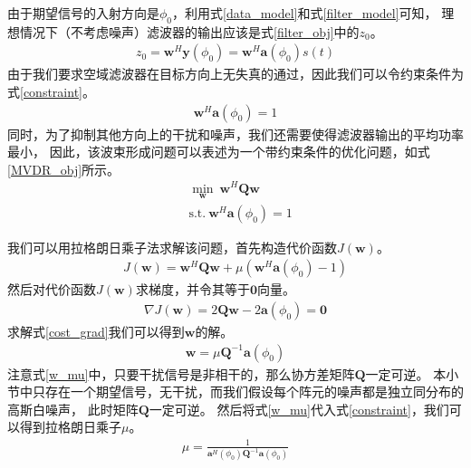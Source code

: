 \documentclass[master]{thesis-uestc}
\begin{document}
由于期望信号的入射方向是$\phi_0$，利用式\eqref{data_model}和式\eqref{filter_model}可知，
理想情况下（不考虑噪声）滤波器的输出应该是式\eqref{filter_obj}中的$z_0$。
\begin{equation}\label{filter_obj}
    \begin{aligned}
    z_0 = \bm{w}^H\bm{y}(\phi_0) = \bm{w}^H\bm{a}(\phi_0)s(t)
    \end{aligned}
\end{equation}
由于我们要求空域滤波器在目标方向上无失真的通过，因此我们可以令约束条件为式\eqref{constraint}。
\begin{equation}\label{constraint}
    \begin{aligned}
    \bm{w}^H\bm{a}(\phi_0) = 1
    \end{aligned}
\end{equation}
同时，为了抑制其他方向上的干扰和噪声，我们还需要使得滤波器输出的平均功率最小，
因此，该波束形成问题可以表述为一个带约束条件的优化问题，如式\eqref{MVDR_obj}所示。
\begin{equation}\label{MVDR_obj}
    \begin{aligned}
    &\min_\bm{w} ~ \bm{w}^H\bm{Q}\bm{w} \\
    &\text{s.t.} ~ \bm{w}^H\bm{a}(\phi_0) = 1
    \end{aligned}
\end{equation}

我们可以用拉格朗日乘子法求解该问题，首先构造代价函数$J(\bm{w})$。
\begin{equation}
    \begin{aligned}
    J(\bm{w}) = \bm{w}^H\bm{Q}\bm{w} + \mu\left(\bm{w}^H\bm{a}(\phi_0)-1\right)
    \end{aligned}
\end{equation}
然后对代价函数$J(\bm{w})$求梯度，并令其等于$\textbf{0}$向量。
\begin{equation}\label{cost_grad}
    \begin{aligned}
    \nabla J(\bm{w}) = 2\bm{Q}\bm{w} - 2\bm{a}(\phi_0) = \textbf{0}
    \end{aligned}
\end{equation}
求解式\eqref{cost_grad}我们可以得到$\bm{w}$的解。
\begin{equation}\label{w_mu}
    \begin{aligned}
    \bm{w} = \mu\bm{Q}^{-1}\bm{a}(\phi_0)
    \end{aligned}
\end{equation}
注意式\eqref{w_mu}中，只要干扰信号是非相干的，那么协方差矩阵$\bm{Q}$一定可逆。
本小节中只存在一个期望信号，无干扰，而我们假设每个阵元的噪声都是独立同分布的高斯白噪声，
此时矩阵$\bm{Q}$一定可逆。
然后将式\eqref{w_mu}代入式\eqref{constraint}，我们可以得到拉格朗日乘子$\mu$。
\begin{equation}\label{larg_arg}
    \begin{aligned}
    \mu = \frac{1}{\bm{a}^H(\phi_0)\bm{Q}^{-1}\bm{a}(\phi_0)}
    \end{aligned}
\end{equation}
\end{document}
